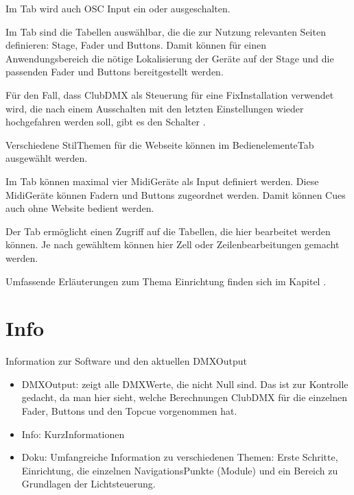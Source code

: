 \documentclass[letterpaper,10pt,ngerman]{sphinxmanual}
\begin{document}
Im \sphinxhyphen{}Tab wird auch OSC Input ein\sphinxhyphen{} oder ausgeschalten.

Im \sphinxhyphen{}Tab sind die Tabellen auswählbar, die die zur Nutzung
relevanten Seiten definieren: Stage, Fader und Buttons. Damit können für einen
Anwendungsbereich die nötige Lokalisierung der Geräte auf der Stage und die
passenden Fader und Buttons bereitgestellt werden.

Für den Fall, dass ClubDMX als Steuerung für eine Fix\sphinxhyphen{}Installation verwendet
wird, die nach einem Ausschalten mit den letzten Einstellungen wieder
hochgefahren werden soll, gibt es den Schalter .

Verschiedene Stil\sphinxhyphen{}Themen für die Webseite können im Bedienelemente\sphinxhyphen{}Tab
ausgewählt werden.

Im \sphinxhyphen{}Tab können maximal vier Midi\sphinxhyphen{}Geräte als Input definiert werden. Diese
Midi\sphinxhyphen{}Geräte können Fadern und Buttons zugeordnet werden. Damit können Cues
auch ohne Website bedient werden.

Der \sphinxhyphen{}Tab ermöglicht einen Zugriff auf die Tabellen, die hier
bearbeitet werden können. Je nach gewähltem {\hyperref[\detokenize{grundlagen:bearbeitungsmoduslabel}]{}}
können hier
Zell\sphinxhyphen{} oder Zeilenbearbeitungen gemacht werden.

Umfassende Erläuterungen zum Thema Einrichtung finden sich im
Kapitel {\hyperref[\detokenize{einrichten:einrichten-label}]{}} .


\section{Info}
\label{\detokenize{navigation:info}}
Information zur Software und den aktuellen DMX\sphinxhyphen{}Output
\begin{itemize}
\item {} 
DMX\sphinxhyphen{}Output: zeigt alle DMX\sphinxhyphen{}Werte, die nicht Null sind. Das ist
zur Kontrolle gedacht, da man hier sieht, welche Berechnungen ClubDMX
für die einzelnen Fader, Buttons und den Topcue vorgenommen hat.

\item {} 
Info: Kurz\sphinxhyphen{}Informationen

\item {} 
Doku: Umfangreiche Information zu verschiedenen Themen: Erste Schritte,
Einrichtung, die einzelnen Navigations\sphinxhyphen{}Punkte (Module) und ein Bereich
zu Grundlagen der Lichtsteuerung.

\end{itemize}
\end{document}
